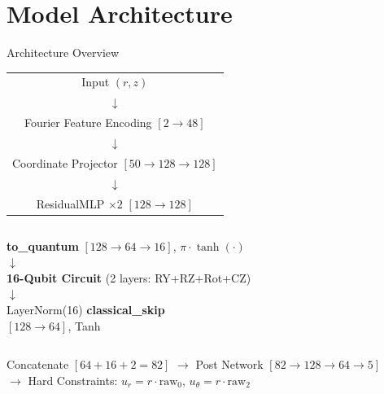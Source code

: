 \documentclass[aspectratio=169]{beamer}
\begin{document}
\section{Model Architecture}

\begin{frame}{Architecture Overview}
\begin{center}
\small
\begin{tabular}{c}
Input $(r, z)$ \\
$\downarrow$ \\
Fourier Feature Encoding $[2 \to 48]$ \\
$\downarrow$ \\
Coordinate Projector $[50 \to 128 \to 128]$ \\
$\downarrow$ \\
ResidualMLP $\times 2$ $[128 \to 128]$ \\
\end{tabular}
\end{center}

\vspace{0.2cm}
\begin{columns}
\centering
\textbf{to\_quantum} $[128\to64\to16]$, $\pi\cdot\tanh(\cdot)$ \\
$\downarrow$ \\
\textbf{16-Qubit Circuit} (2 layers: RY+RZ+Rot+CZ) \\
$\downarrow$ \\
LayerNorm(16)
\centering
\textbf{classical\_skip} \\
$[128 \to 64]$, Tanh
\end{columns}

\vspace{0.2cm}
\begin{center}
Concatenate $[64+16+2=82]$ $\to$ Post Network $[82\to128\to64\to5]$ \\
$\to$ Hard Constraints: $u_r = r\cdot\text{raw}_0$, $u_\theta = r \cdot \text{raw}_2$
\end{center}
\end{frame}
\end{document}
